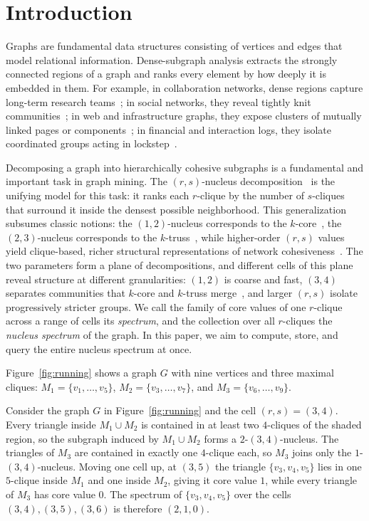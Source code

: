 \section{Introduction}
\label{sec:intro}

Graphs are fundamental data structures consisting of vertices and edges that model relational information.
%
Dense-subgraph analysis extracts the strongly connected regions of a graph and ranks every element by how deeply it is embedded in them.
%
For example, in collaboration networks, dense regions capture long-term research teams~\cite{girvan2002community}; in social networks, they reveal tightly knit communities~\cite{malliaros2013clustering}; in web and infrastructure graphs, they expose clusters of mutually linked pages or components~\cite{gibson1998inferring}; in financial and interaction logs, they isolate coordinated groups acting in lockstep~\cite{jiang2016catching}.

Decomposing a graph into hierarchically cohesive subgraphs is a fundamental and important task in graph mining.
%
The $(r,s)$-nucleus decomposition~\cite{firstNucleus} is the unifying model for this task: it ranks each $r$-clique by the number of $s$-cliques that surround it inside the densest possible neighborhood.
%
This generalization subsumes classic notions: the $(1,2)$-nucleus corresponds to the $k$-core~\cite{seidman1983network}, the $(2,3)$-nucleus corresponds to the $k$-truss~\cite{cohen2008trusses}, while higher-order $(r,s)$ values yield clique-based, richer structural representations of network cohesiveness~\cite{nuclearTWEB}.
%
The two parameters form a plane of decompositions, and different cells of this plane reveal structure at different granularities: $(1,2)$ is coarse and fast, $(3,4)$ separates communities that $k$-core and $k$-truss merge~\cite{firstNucleus}, and larger $(r,s)$ isolate progressively stricter groups.
%
We call the family of core values of one $r$-clique across a range of cells its \textit{spectrum}, and the collection over all $r$-cliques the \textit{nucleus spectrum} of the graph.
%
In this paper, we aim to compute, store, and query the entire nucleus spectrum at once.

Figure~\ref{fig:running} shows a graph $G$ with nine vertices and three maximal cliques: $M_1=\{v_1,\dots,v_5\}$, $M_2=\{v_3,\dots,v_7\}$, and $M_3=\{v_6,\dots,v_9\}$.
%
\begin{example}
\label{exa:running}
Consider the graph $G$ in Figure~\ref{fig:running} and the cell $(r,s)=(3,4)$.
%
Every triangle inside $M_1\cup M_2$ is contained in at least two $4$-cliques of the shaded region, so the subgraph induced by $M_1\cup M_2$ forms a $2$-$(3,4)$-nucleus.
%
The triangles of $M_3$ are contained in exactly one $4$-clique each, so $M_3$ joins only the $1$-$(3,4)$-nucleus.
%
Moving one cell up, at $(3,5)$ the triangle $\{v_3,v_4,v_5\}$ lies in one $5$-clique inside $M_1$ and one inside $M_2$, giving it core value $1$, while every triangle of $M_3$ has core value $0$.
%
The spectrum of $\{v_3,v_4,v_5\}$ over the cells $(3,4),(3,5),(3,6)$ is therefore $(2,1,0)$.
\end{example}

